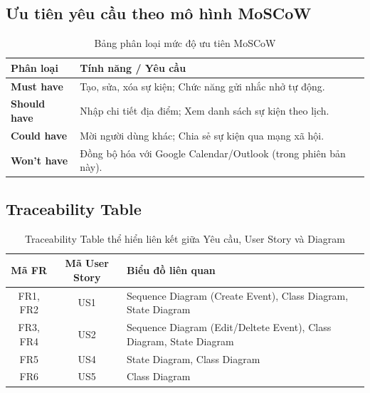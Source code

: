 \subsection{Ưu tiên yêu cầu theo mô hình MoSCoW}

\begin{table}[H]
\centering
\renewcommand{\arraystretch}{1.3}
\begin{tabular}{|l|p{10cm}|}
\hline
\textbf{Phân loại} & \textbf{Tính năng / Yêu cầu} \\ \hline
\textbf{Must have} & Tạo, sửa, xóa sự kiện; Chức năng gửi nhắc nhở tự động. \\ \hline
\textbf{Should have} & Nhập chi tiết địa điểm; Xem danh sách sự kiện theo lịch. \\ \hline
\textbf{Could have} & Mời người dùng khác; Chia sẻ sự kiện qua mạng xã hội. \\ \hline
\textbf{Won't have} & Đồng bộ hóa với Google Calendar/Outlook (trong phiên bản này). \\ \hline
\end{tabular}
\caption{Bảng phân loại mức độ ưu tiên MoSCoW}
\end{table}

\subsection{Traceability Table}

\begin{table}[H]
\centering
\renewcommand{\arraystretch}{1.3}
\begin{tabular}{|c|c|p{9.5cm}|}
\hline
\textbf{Mã FR} & \textbf{Mã User Story} & \textbf{Biểu đồ liên quan} \\ \hline
FR1, FR2 & US1 & Sequence Diagram (Create Event), Class Diagram, State Diagram\\ \hline
FR3, FR4 & US2 & Sequence Diagram (Edit/Deltete Event), Class Diagram, State Diagram \\ \hline
FR5 & US4 & State Diagram, Class Diagram \\ \hline
FR6 & US5 & Class Diagram \\ \hline
\end{tabular}
\caption{Traceability Table thể hiển liên kết giữa Yêu cầu, User Story và Diagram}
\end{table}
